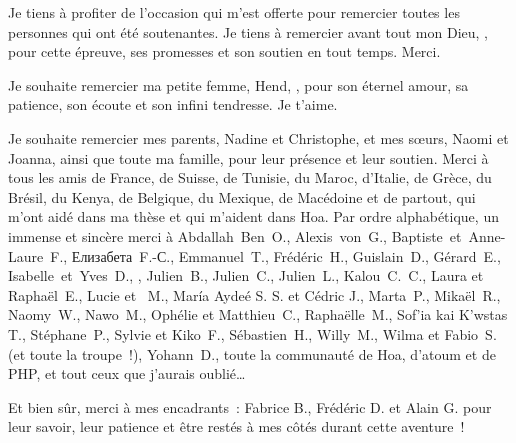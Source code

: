  Je tiens à profiter de l'occasion qui m'est
offerte pour remercier toutes les personnes qui ont été soutenantes. Je tiens à
remercier avant tout mon Dieu, , pour cette épreuve,
ses promesses et son soutien en tout temps. Merci.

Je souhaite remercier ma petite femme, Hend, , pour son
éternel amour, sa patience, son écoute et son infini tendresse. Je t'aime.

Je souhaite remercier mes parents, Nadine et Christophe, et mes sœurs, Naomi et
Joanna, ainsi que toute ma famille, pour leur présence et leur soutien.
%
Merci à tous les amis de France, de Suisse, de Tunisie, du Maroc, d'Italie, de
Grèce, du Brésil, du Kenya, de Belgique, du Mexique, de Macédoine et de partout,
qui m'ont aidé dans ma thèse et qui m'aident dans Hoa. Par ordre alphabétique,
un immense et sincère merci à
Abdallah~Ben~O.,
Alexis~von~G.,
Baptiste~et~Anne-Laure~F.,
\foreignlanguage{russian}{Елизабета}~F.-\foreignlanguage{russian}{С}.,
Emmanuel~T.,
Frédéric~H.,
Guislain~D.,
Gérard~E.,
Isabelle~et~Yves~D.,
,
Julien~B.,
Julien~C.,
Julien~L.,
Kalou~C.~C.,
Laura et Raphaël~E.,
Lucie et ~M.,
\foreignlanguage{spanish}{María Aydeé} S. S. et Cédric J.,
Marta~P.,
Mikaël~R.,
\foreignlanguage{english}{Naomy~W.},
Nawo~M.,
Ophélie et Matthieu~C.,
Raphaëlle~M.,
\foreignlanguage{greek}{\textgreek{Sof'ia kai K'wstas T.}},
Stéphane~P.,
Sylvie et Kiko~F.,
Sébastien~H.,
Willy~M.,
Wilma et \foreignlanguage{italian}{Fabio}~S. (et toute la troupe~!),
Yohann~D.,
toute la communauté de Hoa, d'atoum et de PHP,
et tout ceux que j'aurais oublié…

Et bien sûr, merci à mes encadrants~: Fabrice B., Frédéric D. et Alain G. pour
leur savoir, leur patience et être restés à mes côtés durant cette aventure~!

